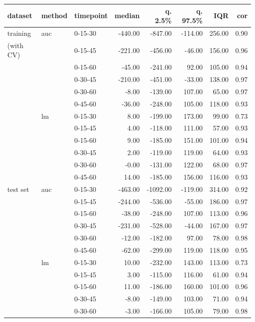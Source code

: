 \documentclass[12pt]{article}
\begin{document}
\begin{table}[ht]
\centering
\begin{tabular}{lllrrrrr}
  \hline
dataset & method & timepoint & median & q. 2.5\% & q. 97.5\% & IQR & cor \\ 
  \hline
training & auc & 0-15-30 & -440.00 & -847.00 & -114.00 & 256.00 & 0.90 \\ 
  (with CV) &  & 0-15-45 & -221.00 & -456.00 & -46.00 & 156.00 & 0.96 \\ 
   &  & 0-15-60 & -45.00 & -241.00 & 92.00 & 105.00 & 0.94 \\ 
   &  & 0-30-45 & -210.00 & -451.00 & -33.00 & 138.00 & 0.97 \\ 
   &  & 0-30-60 & -8.00 & -139.00 & 107.00 & 65.00 & 0.97 \\ 
   &  & 0-45-60 & -36.00 & -248.00 & 105.00 & 118.00 & 0.93 \\ [1mm]
   & lm & 0-15-30 & 8.00 & -199.00 & 173.00 & 99.00 & 0.73 \\ 
   &  & 0-15-45 & 4.00 & -118.00 & 111.00 & 57.00 & 0.93 \\ 
   &  & 0-15-60 & 9.00 & -185.00 & 151.00 & 101.00 & 0.94 \\ 
   &  & 0-30-45 & 2.00 & -119.00 & 119.00 & 64.00 & 0.93 \\ 
   &  & 0-30-60 & -0.00 & -131.00 & 122.00 & 68.00 & 0.97 \\ 
   &  & 0-45-60 & 14.00 & -185.00 & 156.00 & 116.00 & 0.93 \\ [3mm]
  test set & auc & 0-15-30 & -463.00 & -1092.00 & -119.00 & 314.00 & 0.92 \\ 
   &  & 0-15-45 & -244.00 & -536.00 & -55.00 & 186.00 & 0.97 \\ 
   &  & 0-15-60 & -38.00 & -248.00 & 107.00 & 113.00 & 0.96 \\ 
   &  & 0-30-45 & -231.00 & -528.00 & -44.00 & 167.00 & 0.97 \\ 
   &  & 0-30-60 & -12.00 & -182.00 & 97.00 & 78.00 & 0.98 \\ 
   &  & 0-45-60 & -62.00 & -299.00 & 119.00 & 118.00 & 0.95 \\ [1mm]
   & lm & 0-15-30 & 10.00 & -232.00 & 143.00 & 113.00 & 0.73 \\ 
   &  & 0-15-45 & 3.00 & -115.00 & 116.00 & 61.00 & 0.94 \\ 
   &  & 0-15-60 & 11.00 & -186.00 & 160.00 & 101.00 & 0.96 \\ 
   &  & 0-30-45 & -8.00 & -149.00 & 103.00 & 71.00 & 0.94 \\ 
   &  & 0-30-60 & -3.00 & -166.00 & 105.00 & 79.00 & 0.98 \\ 

\end{tabular}
\end{table}
\end{document}
